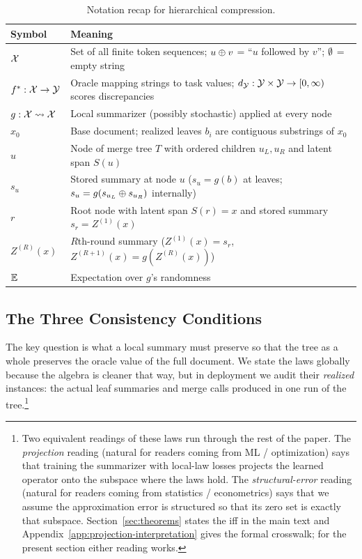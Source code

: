 \begin{table}[t]
\centering\small
\begin{tabular}{ll}
\toprule
Symbol & Meaning \\
\midrule
$\mathcal{X}$ & Set of all finite token sequences; $u \oplus v$ = ``$u$ followed by $v$''; $\emptyset$ = empty string \\
$f^\ast: \mathcal{X} \to \mathcal{Y}$ & Oracle mapping strings to task values; $d_{\mathcal{Y}}: \mathcal{Y} \times \mathcal{Y} \to [0,\infty)$ scores discrepancies \\
$g: \mathcal{X} \rightsquigarrow \mathcal{X}$ & Local summarizer (possibly stochastic) applied at every node \\
$x_0$ & Base document; realized leaves $b_i$ are contiguous substrings of $x_0$ \\
$u$ & Node of merge tree $T$ with ordered children $u_L,u_R$ and latent span $S(u)$ \\
$s_u$ & Stored summary at node $u$ ($s_u=g(b)$ at leaves; $s_u=g(s_{u_L}\oplus s_{u_R})$ internally) \\
$r$ & Root node with latent span $S(r)=x$ and stored summary $s_r = Z^{(1)}(x)$ \\
$Z^{(R)}(x)$ & $R$th-round summary ($Z^{(1)}(x)=s_r$, $Z^{(R+1)}(x)=g(Z^{(R)}(x))$) \\
$\mathbb{E}$ & Expectation over $g$'s randomness \\
\bottomrule
\end{tabular}
\caption{Notation recap for hierarchical compression.}
\label{tab:notation-main}
\end{table}

\subsection{The Three Consistency Conditions}

The key question is what a local summary must preserve so that the tree as a whole preserves the oracle value of the full document. We state the laws globally because the algebra is cleaner that way, but in deployment we audit their \emph{realized} instances: the actual leaf summaries and merge calls produced in one run of the tree.\footnote{Two equivalent readings of these laws run through the rest of the paper. The \emph{projection} reading (natural for readers coming from ML / optimization) says that training the summarizer with local-law losses projects the learned operator onto the subspace where the laws hold. The \emph{structural-error} reading (natural for readers coming from statistics / econometrics) says that we assume the approximation error is structured so that its zero set is exactly that subspace. Section~\ref{sec:theorems} states the iff in the main text and Appendix~\ref{app:projection-interpretation} gives the formal crosswalk; for the present section either reading works.}

